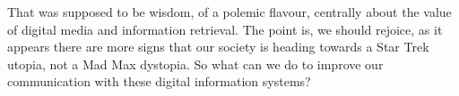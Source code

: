 



That was supposed to be wisdom, of a polemic flavour, centrally about the value of digital media and information retrieval. The point is, we should rejoice, as it appears there are more signs that our society is heading towards a Star Trek utopia, not a Mad Max dystopia. So what can we do to improve our communication with these digital information systems?